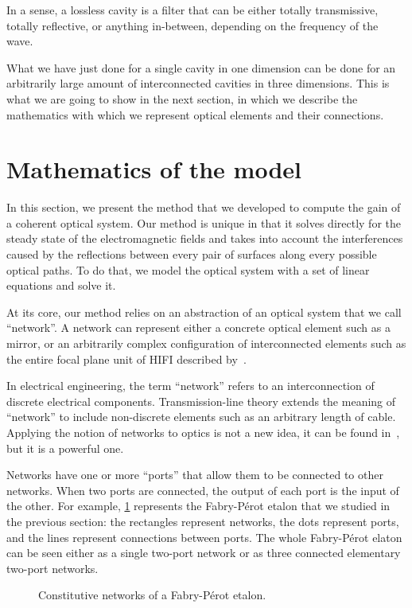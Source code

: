 \begin{refsection}
In a sense, a lossless cavity is a filter that can be either totally transmissive, totally reflective, or anything in-between, depending on the frequency of the wave.

What we have just done for a single cavity in one dimension can be done for an arbitrarily large amount of interconnected cavities in three dimensions.
This is what we are going to show in the next section, in which we describe the mathematics with which we represent optical elements and their connections.



\FloatBarrier
\section{Mathematics of the model}
\label{sec:chapter2_3}

In this section, we present the method that we developed to compute the gain of a coherent optical system.
Our method is unique in that it solves directly for the steady state of the electromagnetic fields and takes into account the interferences caused by the reflections between every pair of surfaces along every possible optical paths.
To do that, we model the optical system with a set of linear equations and solve it.

At its core, our method relies on an abstraction of an optical system that we call ``network''.
A network can represent either a concrete optical element such as a mirror, or an arbitrarily complex configuration of interconnected elements such as the entire focal plane unit of HIFI described by~\textcite{jackson2002hifi}.

In electrical engineering, the term ``network'' refers to an interconnection of discrete electrical components.
Transmission-line theory extends the meaning of ``network'' to include non-discrete elements such as an arbitrary length of cable.
Applying the notion of networks to optics is not a new idea,
it can be found in~\textcite{siegman1986lasers},
but it is a powerful one.

Networks have one or more ``ports'' that allow them to be connected to other networks.
When two ports are connected, the output of each port is the input of the other.
For example, \cref{fig:fp_networks} represents the Fabry-Pérot etalon that we studied in the previous section: the rectangles represent networks, the dots represent ports, and the lines represent connections between ports.
The whole Fabry-Pérot elaton can be seen either as a single two-port network or as three connected elementary two-port networks.
\begin{figure}
    \centering
    
    \caption{Constitutive networks of a Fabry-Pérot etalon.}
    \label{fig:fp_networks}
\end{figure}


\end{refsection}
